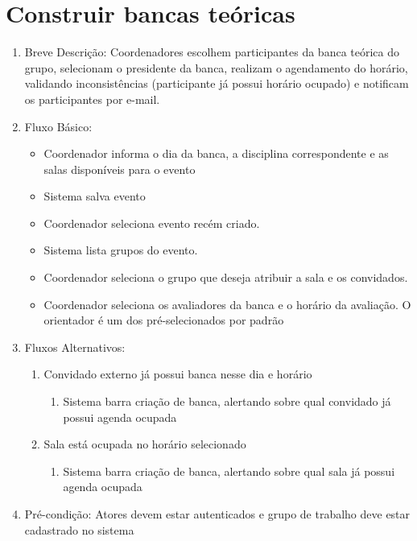\section{Construir bancas teóricas}
\begin{enumerate}
    \item Breve Descrição: Coordenadores escolhem participantes da banca teórica do grupo, selecionam o presidente da banca, realizam o agendamento do horário, validando inconsistências (participante já possui horário ocupado) e notificam os participantes por e-mail.
    \item Fluxo Básico:
    \begin{itemize}
        \item Coordenador informa o dia da banca, a disciplina correspondente e as salas disponíveis para o evento
        \item Sistema salva evento
        \item Coordenador seleciona evento recém criado.
        \item Sistema lista grupos do evento.
        \item Coordenador seleciona o grupo que deseja atribuir a sala e os convidados.
        \item Coordenador seleciona os avaliadores da banca e o horário da avaliação. O orientador é um dos pré-selecionados por padrão
    \end{itemize}
    \item Fluxos Alternativos:
    \begin{enumerate}
        \item Convidado externo já possui banca nesse dia e horário
        \begin{enumerate}
            \item Sistema barra criação de banca, alertando sobre qual convidado já possui agenda ocupada
        \end{enumerate}
        \item Sala está ocupada no horário selecionado
        \begin{enumerate}
            \item Sistema barra criação de banca, alertando sobre qual sala já possui agenda ocupada
        \end{enumerate}
    \end{enumerate}
    \item Pré-condição: Atores devem estar autenticados e grupo de trabalho deve estar cadastrado no sistema
\end{enumerate}

